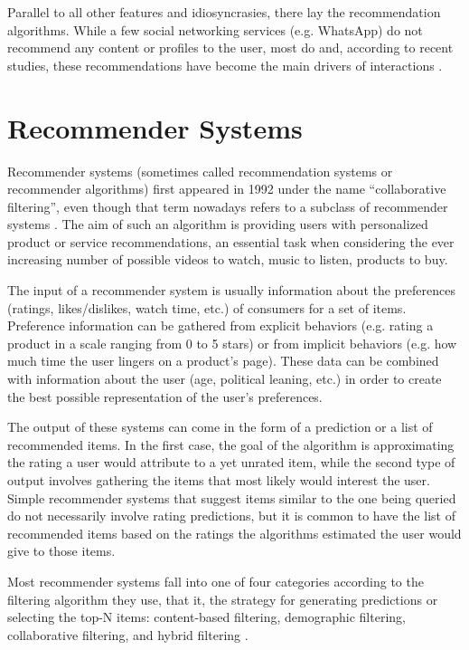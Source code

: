 Parallel to all other features and idiosyncrasies, there lay the recommendation
algorithms. While a few social networking services (e.g. WhatsApp) do not
recommend any content or profiles to the user, most do and, according to recent
studies, these recommendations have become the main drivers of interactions
\citep{stoica_algorithmic_2018}.

\section{Recommender Systems}
\label{sec:recommender_systems}

Recommender systems (sometimes called recommendation systems or recommender
algorithms) first appeared in 1992 under the name ``collaborative filtering'',
even though that term nowadays refers to a subclass of recommender systems
\citep{goldberg_using_1992}. The aim of such an algorithm is providing users
with personalized product or service recommendations, an essential task when
considering the ever increasing number of possible videos to watch, music to
listen, products to buy.

The input of a recommender system is usually information about the preferences
(ratings, likes/dislikes, watch time, etc.) of consumers for a set of items.
Preference information can be gathered from explicit behaviors (e.g. rating a
product in a scale ranging from 0 to 5 stars) or from implicit behaviors (e.g.
how much time the user lingers on a product's page). These data can be combined
with information about the user (age, political leaning, etc.) in order to
create the best possible representation of the user's preferences.

The output of these systems can come in the form of a prediction or a list of
recommended items. In the first case, the goal of the algorithm is approximating
the rating a user would attribute to a yet unrated item, while the second type
of output involves gathering the items that most likely would interest the user.
Simple recommender systems that suggest items similar to the one being queried
do not necessarily involve rating predictions, but it is common to have the list
of recommended items based on the ratings the algorithms estimated the user
would give to those items.

Most recommender systems fall into one of four categories according to the
filtering algorithm they use, that it, the strategy for generating predictions
or selecting the top-N items: content-based filtering, demographic filtering,
collaborative filtering, and hybrid filtering
\citep{bobadilla_recommender_2013}.

